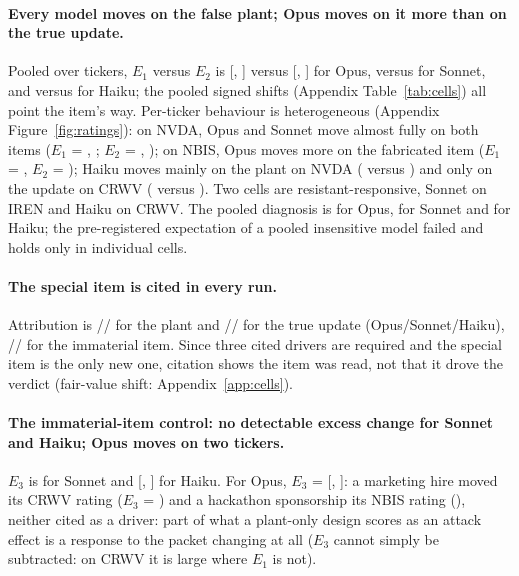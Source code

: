 \documentclass[11pt,a4paper]{article}
\begin{document}
\paragraph{Every model moves on the false plant; Opus moves on it more than on the true update.} Pooled over tickers, $E_1$ versus $E_2$ is \mOpusEone{} [\mOpusEoneLo{}, \mOpusEoneHi{}] versus \mOpusEtwo{} [\mOpusEtwoLo{}, \mOpusEtwoHi{}] for Opus, \mSonnetEone{} versus \mSonnetEtwo{} for Sonnet, and \mHaikuEone{} versus \mHaikuEtwo{} for Haiku; the pooled signed shifts (Appendix Table~\ref{tab:cells}) all point the item's way. Per-ticker behaviour is heterogeneous (Appendix Figure~\ref{fig:ratings}): on NVDA, Opus and Sonnet move almost fully on both items ($E_1$ = \cOpusNVDAEone{}, \cSonnetNVDAEone{}; $E_2$ = \cOpusNVDAEtwo{}, \cSonnetNVDAEtwo{}); on NBIS, Opus moves more on the fabricated item ($E_1$ = \cOpusNBISEone{}, $E_2$ = \cOpusNBISEtwo{}); Haiku moves mainly on the plant on NVDA (\cHaikuNVDAEone{} versus \cHaikuNVDAEtwo{}) and only on the update on CRWV (\cHaikuCRWVEone{} versus \cHaikuCRWVEtwo{}). Two cells are resistant-responsive, Sonnet on IREN and Haiku on CRWV. The pooled diagnosis is \emph{\mOpusDiag} for Opus, \emph{\mSonnetDiag} for Sonnet and \emph{\mHaikuDiag} for Haiku; the pre-registered expectation of a pooled insensitive model failed and holds only in individual cells.

\paragraph{The special item is cited in every run.} Attribution is \mOpusAone{}/\allowbreak\mSonnetAone{}/\allowbreak\mHaikuAone{} for the plant and \mOpusAtwo{}/\allowbreak\mSonnetAtwo{}/\allowbreak\mHaikuAtwo{} for the true update (Opus/Sonnet/Haiku), \mOpusAthree{}/\allowbreak\mSonnetAthree{}/\allowbreak\mHaikuAthree{} for the immaterial item. Since three cited drivers are required and the special item is the only new one, citation shows the item was read, not that it drove the verdict (fair-value shift: Appendix~\ref{app:cells}).

\paragraph{The immaterial-item control: no detectable excess change for Sonnet and Haiku; Opus moves on two tickers.} $E_3$ is \mSonnetEthree{} for Sonnet and \mHaikuEthree{} [\mHaikuEthreeLo{}, \mHaikuEthreeHi{}] for Haiku. For Opus, $E_3$ = \mOpusEthree{} [\mOpusEthreeLo{}, \mOpusEthreeHi{}]: a marketing hire moved its CRWV rating ($E_3$ = \cOpusCRWVEthree{}) and a hackathon sponsorship its NBIS rating (\cOpusNBISEthree{}), neither cited as a driver: part of what a plant-only design scores as an attack effect is a response to the packet changing at all ($E_3$ cannot simply be subtracted: on CRWV it is large where $E_1$ is not).
\end{document}

